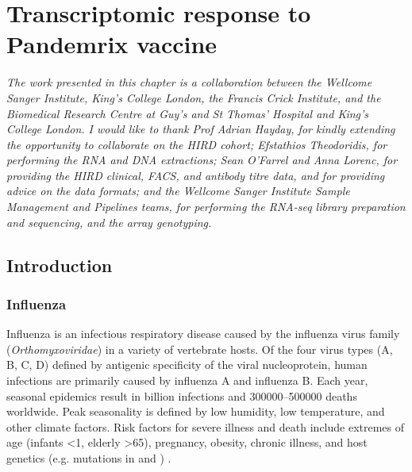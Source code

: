 %
%

\chapter{Transcriptomic response to Pandemrix vaccine}
\label{ch:hird_DGE}

\textit{
    The work presented in this chapter is a collaboration between 
    the Wellcome Sanger Institute,
    King's College London, 
    the Francis Crick Institute,
    and the Biomedical Research Centre at Guy's and St Thomas' Hospital and King's College London.
    I would like to thank 
    Prof Adrian Hayday, for kindly extending the opportunity to collaborate on the HIRD cohort;
    Efstathios Theodoridis, for performing the RNA and DNA extractions;
    Sean O'Farrel and Anna Lorenc, for providing the HIRD clinical, FACS, and antibody titre data, and for providing advice on the data formats;
    and the Wellcome Sanger Institute Sample Management and Pipelines teams, for performing the RNA-seq library preparation and sequencing, and the array genotyping.
}

\section{Introduction}

\subsection{Influenza}

Influenza is an infectious respiratory disease caused by the influenza virus family (\textit{Orthomyxoviridae}) in a variety of vertebrate hosts.
Of the four virus types (A, B, C, D) defined by antigenic specificity of the viral nucleoprotein,
human infections are primarily caused by influenza A and influenza B.
Each year, seasonal epidemics result in  billion infections and \numrange{300000}{500000} deaths worldwide.
Peak seasonality is defined by low humidity, low temperature, and other climate factors.
Risk factors for severe illness and death include extremes of age (infants \SI{<1}{\year}, elderly \SI{>65}{\year}), pregnancy, obesity, chronic illness, and host genetics (e.g. mutations in  and ) \autocite{krammer2018Influenza,dhakal2019HostFactorsImpact}.

